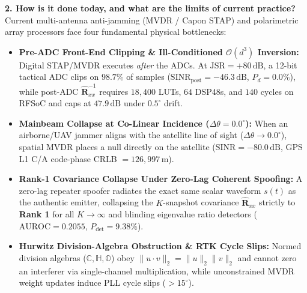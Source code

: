 \documentclass[10pt,a4paper]{article}
\newcommand{\C}{\mathbb{C}}
\newcommand{\Ha}{\mathbb{H}}
\newcommand{\Oc}{\mathbb{O}}
\begin{document}
\textbf{2. How is it done today, and what are the limits of current practice?}\\
Current multi-antenna anti-jamming (MVDR / Capon STAP) and polarimetric array processors face four fundamental physical bottlenecks:
\begin{itemize}
    \item \textbf{Pre-ADC Front-End Clipping \& Ill-Conditioned $\mathcal{O}(d^3)$ Inversion:} Digital STAP/MVDR executes \emph{after} the ADCs. At $\mathrm{JSR} = +80\,\mathrm{dB}$, a 12-bit tactical ADC clips on $98.7\%$ of samples ($\mathrm{SINR}_{\mathrm{post}} = -46.3\,\mathrm{dB}$, $P_d = 0.0\%$), while post-ADC $\hat{\bm{R}}_{xx}^{-1}$ requires $18{,}400$ LUTs, $64$ DSP48s, and $140$ cycles on RFSoC and caps at $47.9\,\mathrm{dB}$ under $0.5^\circ$ drift.
    \item \textbf{Mainbeam Collapse at Co-Linear Incidence ($\Delta\theta = 0.0^\circ$):} When an airborne/UAV jammer aligns with the satellite line of sight ($\Delta\theta \to 0.0^\circ$), spatial MVDR places a null directly on the satellite ($\mathrm{SINR} = -80.0\,\mathrm{dB}$, GPS L1 C/A code-phase CRLB $= 126{,}997\,\mathrm{m}$).
    \item \textbf{Rank-1 Covariance Collapse Under Zero-Lag Coherent Spoofing:} A zero-lag repeater spoofer radiates the exact same scalar waveform $s(t)$ as the authentic emitter, collapsing the $K$-snapshot covariance $\hat{\bm{R}}_{xx}$ strictly to \textbf{Rank 1} for all $K \to \infty$ and blinding eigenvalue ratio detectors ($\mathrm{AUROC} = 0.2055$, $P_{\mathrm{det}} = 9.38\%$).
    \item \textbf{Hurwitz Division-Algebra Obstruction \& RTK Cycle Slips:} Normed division algebras ($\C, \Ha, \Oc$) obey $\|u \cdot v\|_2 = \|u\|_2 \|v\|_2$ and cannot zero an interferer via single-channel multiplication, while unconstrained MVDR weight updates induce PLL cycle slips ($>15^\circ$).
\end{itemize}
\end{document}
